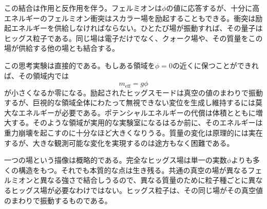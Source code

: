 この結合は作用と反作用を伴う。フェルミオンは\(\phi\)の値に応答するが、十分に高エネルギーのフェルミオン衝突はスカラー場を励起することもできる。衝突は励起エネルギーを供給しなければならない。ひとたび場が振動すれば、その量子はヒッグス粒子である。同じ場は電子だけでなく、クォーク場や、その質量をこの場が供給する他の場とも結合する。

\begin{classroomqa}
\end{classroomqa}

この思考実験は直接的である。もしある領域を\(\phi=0\)の近くに保つことができれば、その領域内では
\begin{equation}
m_{\mathrm{eff}}=g\phi
\end{equation}
が小さくなるか零になる。励起されたヒッグスモードは真空の値のまわりで振動するが、巨視的な領域全体にわたって無視できない変位を生成し維持するには莫大なエネルギーが必要である。ポテンシャルエネルギーの代償は体積とともに増大する。そのような領域が実用的な実験室になるはるか前に、そのエネルギーは重力崩壊を起こすのに十分なほど大きくなりうる。質量の変化は原理的には実在するが、大きな観測可能な変化を実現するのは途方もなく困難である。

\begin{classroomqa}
\end{classroomqa}

\begin{classroomqa}
\end{classroomqa}

一つの場という描像は概略的である。完全なヒッグス場は単一の実数\(\phi\)よりも多くの構造をもつ。それでも本質的な点は生き残る。共通の真空の場が異なるフェルミオンと異なる強さで結合しうるので、異なる質量のために粒子種ごとに異なるヒッグス場が必要なわけではない。ヒッグス粒子は、その同じ場がその真空値のまわりで振動するものである。

